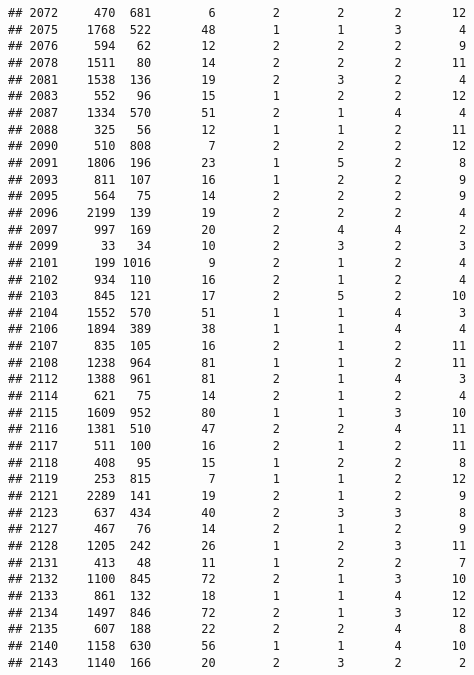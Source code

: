 \documentclass[]{article}
\begin{document}
\begin{verbatim}
## 2072     470  681        6        2        2       2       12
## 2075    1768  522       48        1        1       3        4
## 2076     594   62       12        2        2       2        9
## 2078    1511   80       14        2        2       2       11
## 2081    1538  136       19        2        3       2        4
## 2083     552   96       15        1        2       2       12
## 2087    1334  570       51        2        1       4        4
## 2088     325   56       12        1        1       2       11
## 2090     510  808        7        2        2       2       12
## 2091    1806  196       23        1        5       2        8
## 2093     811  107       16        1        2       2        9
## 2095     564   75       14        2        2       2        9
## 2096    2199  139       19        2        2       2        4
## 2097     997  169       20        2        4       4        2
## 2099      33   34       10        2        3       2        3
## 2101     199 1016        9        2        1       2        4
## 2102     934  110       16        2        1       2        4
## 2103     845  121       17        2        5       2       10
## 2104    1552  570       51        1        1       4        3
## 2106    1894  389       38        1        1       4        4
## 2107     835  105       16        2        1       2       11
## 2108    1238  964       81        1        1       2       11
## 2112    1388  961       81        2        1       4        3
## 2114     621   75       14        2        1       2        4
## 2115    1609  952       80        1        1       3       10
## 2116    1381  510       47        2        2       4       11
## 2117     511  100       16        2        1       2       11
## 2118     408   95       15        1        2       2        8
## 2119     253  815        7        1        1       2       12
## 2121    2289  141       19        2        1       2        9
## 2123     637  434       40        2        3       3        8
## 2127     467   76       14        2        1       2        9
## 2128    1205  242       26        1        2       3       11
## 2131     413   48       11        1        2       2        7
## 2132    1100  845       72        2        1       3       10
## 2133     861  132       18        1        1       4       12
## 2134    1497  846       72        2        1       3       12
## 2135     607  188       22        2        2       4        8
## 2140    1158  630       56        1        1       4       10
## 2143    1140  166       20        2        3       2        2

\end{verbatim}
\end{document}
